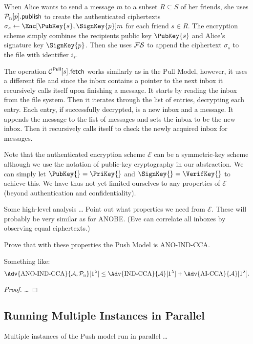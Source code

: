 When Alice wants to send a message \(m\) to a subset \(R\subseteq S\) of her 
friends, she uses \(\pnpub{p}\) to create the authenticated ciphertexts 
\(\sigma_s\gets \Enc[\PubKey{s}, \SignKey{p}]{m}\) for each friend \(s\in R\).
The encryption scheme simply combines the recipients public key \(\PubKey{s}\) 
and Alice's signature key \(\SignKey{p}\).
Then she uses \(\FS\) to append the ciphertext \(\sigma_s\) to the file with 
identifier \(i_s\).

The operation \(\pget{s}\) works similarly as in the Pull Model, however, it 
uses a different file and since the inbox contains a pointer to the next inbox 
it recursively calls itself upon finishing a message.
It starts by reading the inbox from the file system.
Then it iterates through the list of entries, decrypting each entry.
Each entry, if successfully decrypted, is a new inbox and a message.
It appends the message to the list of messages and sets the inbox to be the new
inbox.
Then it recursively calls itself to check the newly acquired inbox for 
messages.

Note that the authenticated encryption scheme \(\mathcal{E}\) can be 
a symmetric-key scheme although we use the notation of public-key cryptography 
in our abstraction.
We can simply let \(\PubKey{} = \PriKey{}\) and \(\SignKey{} = \VerifKey{}\) to 
achieve this.
We have thus not yet limited ourselves to any properties of \(\mathcal{E}\) 
(beyond authentication and confidentiality).

Some high-level analysis \dots
Point out what properties we need from \(\mathcal{E}\).
These will probably be very similar as for \ac{ANOBE}.
(Eve can correlate all inboxes by observing equal ciphertexts.)

Prove that with these properties the Push Model is ANO-IND-CCA\@.
\begin{theorem}
  Something like:
  \[\Adv{\text{ANO-IND-CCA}}{\A, \PushOp}[1^\lambda]\leq 
    \Adv{\text{IND-CCA}}{\A}[1^\lambda] + \Adv{\text{AI-CCA}}{\A}[1^\lambda].\]
\end{theorem}
\begin{proof}
  \dots
\end{proof}

\subsection{Running Multiple Instances in Parallel}
\label{ParallelPush}

Multiple instances of the Push model run in parallel \dots

